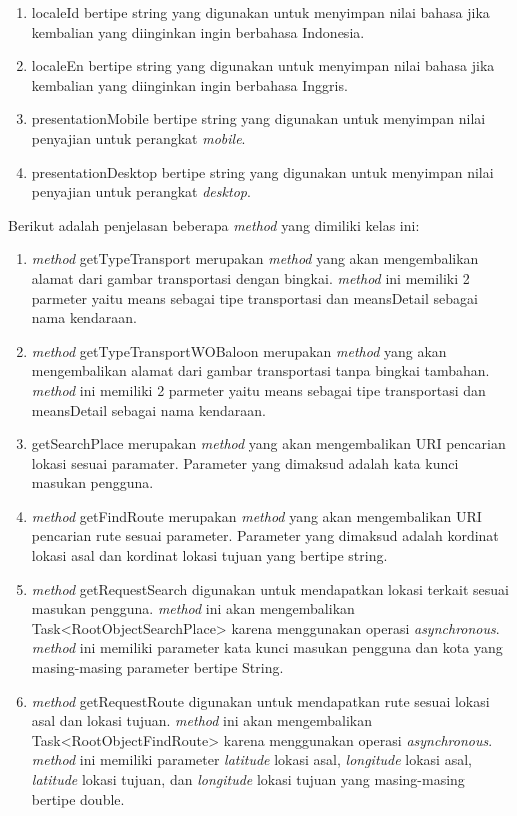 \begin{enumerate}
	\item localeId bertipe string yang digunakan untuk menyimpan nilai bahasa jika kembalian yang diinginkan ingin berbahasa Indonesia.
	\item localeEn bertipe string yang digunakan untuk menyimpan nilai bahasa jika kembalian yang diinginkan ingin berbahasa Inggris.
	\item presentationMobile bertipe string yang digunakan untuk menyimpan nilai penyajian untuk perangkat \textit{mobile}.
	\item presentationDesktop bertipe string yang digunakan untuk menyimpan nilai penyajian untuk perangkat \textit{desktop}.
\end{enumerate}

Berikut adalah penjelasan beberapa \textit{method} yang dimiliki kelas ini:
\begin{enumerate}
	\item \textit{method} getTypeTransport merupakan \textit{method} yang akan mengembalikan alamat dari gambar transportasi dengan bingkai. \textit{method} ini memiliki 2 parmeter yaitu means sebagai tipe transportasi dan meansDetail sebagai nama kendaraan.
	\item \textit{method} getTypeTransportWOBaloon merupakan \textit{method} yang akan mengembalikan alamat dari gambar transportasi tanpa bingkai tambahan. \textit{method} ini memiliki 2 parmeter yaitu means sebagai tipe transportasi dan meansDetail sebagai nama kendaraan.
	\item getSearchPlace merupakan \textit{method} yang akan mengembalikan URI pencarian lokasi sesuai paramater. Parameter yang dimaksud adalah kata kunci masukan pengguna.
	\item \textit{method} getFindRoute merupakan \textit{method} yang akan mengembalikan URI pencarian rute sesuai parameter. Parameter yang dimaksud adalah kordinat lokasi asal dan kordinat lokasi tujuan yang bertipe string.
	\item \textit{method} getRequestSearch digunakan untuk mendapatkan lokasi terkait sesuai masukan pengguna. \textit{method} ini akan mengembalikan Task<RootObjectSearchPlace> karena menggunakan operasi \textit{asynchronous}. \textit{method} ini memiliki parameter kata kunci masukan pengguna dan kota yang masing-masing parameter bertipe String.
		\item \textit{method} getRequestRoute digunakan untuk mendapatkan rute sesuai lokasi asal dan lokasi tujuan. \textit{method} ini akan mengembalikan Task<RootObjectFindRoute> karena menggunakan operasi \textit{asynchronous}. \textit{method} ini memiliki parameter \textit{latitude} lokasi asal, \textit{longitude} lokasi asal, \textit{latitude} lokasi tujuan, dan \textit{longitude} lokasi tujuan yang masing-masing bertipe double.
\end{enumerate}

